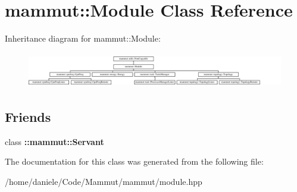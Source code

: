 \hypertarget{classmammut_1_1Module}{\section{mammut\-:\-:Module Class Reference}
\label{classmammut_1_1Module}
}
Inheritance diagram for mammut\-:\-:Module\-:\begin{figure}[H]
\begin{center}
\leavevmode
\includegraphics[height=1.568627cm]{classmammut_1_1Module}
\end{center}
\end{figure}
\subsection*{Friends}
\begin{DoxyCompactItemize}
\item 
\hypertarget{classmammut_1_1Module_a228d7ba30b07bfe0230ce7ffb257944f}{class {\bfseries \-::mammut\-::\-Servant}}\label{classmammut_1_1Module_a228d7ba30b07bfe0230ce7ffb257944f}

\end{DoxyCompactItemize}


The documentation for this class was generated from the following file\-:\begin{DoxyCompactItemize}
\item 
/home/daniele/\-Code/\-Mammut/mammut/module.\-hpp\end{DoxyCompactItemize}
